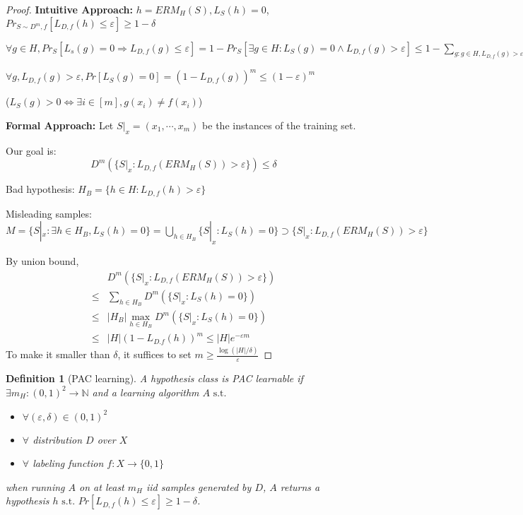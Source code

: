 \documentclass{book}
\newcommand{\st}{\text{ s.t. }}
\newtheorem{Def}{Definition}[section]
\begin{document}
\begin{proof}
  
  \textbf{Intuitive Approach: }$h=ERM_{H}(S),L_{S}(h)=0$, $Pr_{S\sim D^{m},f}[L_{D,f}(h)\leq \varepsilon]\geq 1-\delta$

  $\forall g\in H, Pr_{S}[L_{s}(g)=0\Rightarrow L_{D,f}(g)\leq\varepsilon]=1-Pr_{S}[\exists g\in H:L_{S}(g)=0\land L_{D,f}(g)>\varepsilon]\leq 1-\sum_{g:g\in H, L_{D,f}(g)>\varepsilon}\geq 1-|H|(1-\varepsilon)^{m}$

$\forall g, L_{D,f}(g)>\varepsilon, Pr[L_{S}(g)=0]=(1-L_{D,f}(g))^{m}\leq (1-\varepsilon)^{m}$

($L_{S}(g)>0\Leftrightarrow \exists i\in [m],g(x_{i})\neq f(x_{i})$)

  \textbf{Formal Approach: }Let $S|_{x}=(x_{1},\cdots,x_{m})$ be the instances of the training set.

 Our goal is:
 \[D^{m}(\{S|_{x}:L_{D,f}(ERM_{H}(S))>\varepsilon\})\leq \delta\]
   
 Bad hypothesis: $H_{B}=\{h\in H:L_{D,f}(h)>\varepsilon\}$

 Misleading samples: $M=\{S|_{x}:\exists h\in H_{B},L_{S}(h)=0\}=\bigcup\limits_{h\in H_{B}}\{S|_{x}:L_{S}(h)=0\}\supset \{S|_{x}:L_{D,f}(ERM_{H}(S))>\varepsilon\}$

 By union bound,
 \begin{align*}
   &D^{m}(\{S|_{x}:L_{D,f}(ERM_{H}(S))>\varepsilon\})\\
   \leq&\sum_{h\in H_{B}}D^{m}(\{S|_{x}:L_{S}(h)=0\})\\
   \leq& |H_{B}|\max_{h\in H_{B}}D^{m}(\{S|_{x}:L_{S}(h)=0\})\\
   \leq&|H|(1-L_{D.f}(h))^{m}\leq |H|e^{-\varepsilon m}
   \end{align*}
  To make it smaller than $\delta$, it suffices to set $m\geq \frac{\log(|H|/\delta)}{\varepsilon}$
\end{proof}

\begin{Def}[PAC learning]
  A hypothesis class is PAC learnable if $\exists m_{H}:(0,1)^{2}\to\mathbb{N}$ and a learning algorithm $A\st$
  \begin{itemize}
  \item $\forall (\varepsilon,\delta)\in (0,1)^{2}$
  \item $\forall$ distribution $D$ over $X$
  \item $\forall$ labeling function $f:X\to \{0,1\}$
  \end{itemize}
  when running $A$ on  at least $m_{H}$ iid samples generated by $D$, $A$ returns a hypothesis $h \st Pr[L_{D,f}(h)\leq \varepsilon]\geq 1-\delta$.
\end{Def}
\end{document}

